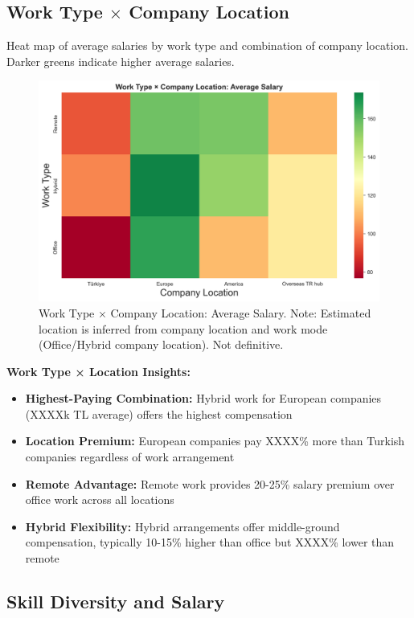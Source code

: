 \documentclass[12pt,a4paper]{article}
\begin{document}
\subsection{Work Type \texorpdfstring{\(\times\)}{} Company Location}
Heat map of average salaries by work type and combination of company location. Darker greens indicate higher average salaries.

\begin{figure}[H]
    \centering
    \includegraphics[width=\textwidth]{figures/heatmap_worktype_location_salary.png}
    \caption{Work Type \(\times\) Company Location: Average Salary. Note: Estimated location is inferred from company location and work mode (Office/Hybrid \textrightarrow{} company location). Not definitive.}
\end{figure}

\textbf{Work Type × Location Insights:}
\begin{itemize}
    \item \textbf{Highest-Paying Combination:} Hybrid work for European companies (XXXXk TL average) offers the highest compensation
    \item \textbf{Location Premium:} European companies pay XXXX\% more than Turkish companies regardless of work arrangement
    \item \textbf{Remote Advantage:} Remote work provides 20-25\% salary premium over office work across all locations
    \item \textbf{Hybrid Flexibility:} Hybrid arrangements offer middle-ground compensation, typically 10-15\% higher than office but XXXX\% lower than remote
\end{itemize}
\subsection{Skill Diversity and Salary}
\end{document}

